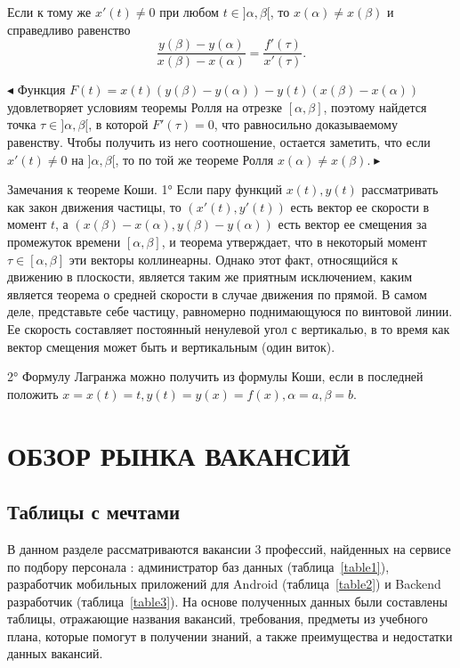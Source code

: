\documentclass[14pt]{extreport}
\begin{document}
Если к тому же $x'(t) \neq 0$ при любом $t \in]\alpha, \beta[$, то $x(\alpha) \neq x(\beta)$ и справедливо
равенство
\[\frac{y(\beta)- y(\alpha)}{x(\beta)- x(\alpha)}=\frac{f'(\tau)}{x'(\tau)}.\]

$\blacktriangleleft$ Функция $F(t) = x(t)( y(\beta) - y(\alpha)) - y(t)(x(\beta) - x(\alpha))$ удовлетворяет условиям теоремы Ролля на отрезке $[\alpha, \beta]$, поэтому найдется точка $\tau\in]\alpha, \beta[$, в которой $F'(\tau) = 0$, что равносильно доказываемому равенству. Чтобы получить из него соотношение, остается заметить, что если $x'(t) \neq 0$ на $]\alpha, \beta[$, то по той же теореме Ролля $x(\alpha) \neq x(\beta). \blacktriangleright$

Замечания к теореме Коши. 1° Если пару функций $x(t), y(t)$ рассматривать как закон движения частицы, то $(x'(t), y'(t))$ есть вектор ее скорости в момент $t$, а $(x(\beta) - x(\alpha), y(\beta) - y(\alpha))$ есть вектор ее смещения за промежуток времени $[\alpha, \beta]$, и теорема утверждает, что в некоторый момент $\tau \in[\alpha, \beta]$ эти векторы коллинеарны. Однако этот факт, относящийся к движению в плоскости, является таким же приятным исключением, каким является теорема о средней скорости в случае движения по прямой. В самом деле, представьте себе частицу, равномерно поднимающуюся по винтовой линии. Ее скорость составляет постоянный ненулевой угол с вертикалью, в то время как вектор смещения может быть и вертикальным (один виток).

2° Формулу Лагранжа можно получить из формулы Коши, если в последней положить $x = x(t)=t, y(t)= y(x)= f (x), \alpha=a, \beta =b$.



\chapter{ОБЗОР РЫНКА ВАКАНСИЙ\label{chapter2}}

\section{Таблицы с мечтами}

В данном разделе рассматриваются вакансии 3 профессий, найденных на сервисе по подбору персонала \cite{bib2}: администратор баз данных (таблица~\ref{table1}), разработчик мобильных приложений для Android (таблица~\ref{table2}) и Backend разработчик (таблица~\ref{table3}). На основе полученных данных были составлены таблицы, отражающие названия вакансий, требования, предметы из учебного плана, которые помогут в получении знаний, а также преимущества и недостатки данных вакансий.
\end{document}
